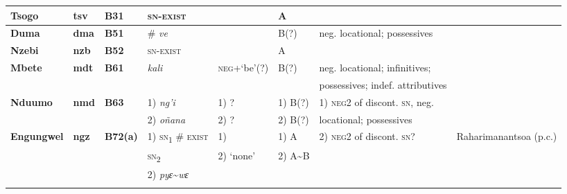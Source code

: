 \documentclass[output=paper]{langsci/langscibook}
\begin{document}
\begin{sidewaystable}[p]
\begin{scriptsize}
\begin{tabularx}{\textwidth}{llllllll}
\textbf{Tsogo}	&\textbf{tsv}		&\textbf{B31} 	&\textsc{sn-exist}	&\textendash								&A 		& 									&\citet{Marchal1979}\\\midrule
\textbf{Duma}	&\textbf{dma}	&\textbf{B51}	&\# \textit{ve}	&\textendash								&B(?)	&neg. locational; possessives 			&\citet{Adam1954}\\\midrule
\textbf{Nzebi}	&\textbf{nzb}	&\textbf{B52}	&\textsc{sn-exist}	&\textendash								&A 		& 				 					&\citet{Marchal1987}\\\midrule
\textbf{Mbete} 	&\textbf{mdt} 	&\textbf{B61} 	&\textit{kali} 	&\textsc{neg}+`be'(?) 					&B(?) 	&neg. locational; infinitives;			&\citet{Adam1954}\\
				&				&				&				&										&		&possessives; indef. attributives		&\\\midrule
\textbf{Nduumo} &\textbf{nmd} 	& \textbf{B63} 	&1) \textit{ng'i}	& 1) ?									&1) B(?)	&1) \textsc{neg}2 of discont. \textsc{sn}, neg.	&\citet{Adam1954}\\
				&				&				&2) \textit{o\~n{}ana} &2) ?									&2) B(?)	&locational; possessives 				&\\\midrule
\textbf{Engungwel} & \textbf{ngz} &\textbf{B72(a)} 	&1) \textsc{sn}\textsubscript{1} \# \textsc{exist}& 1) \textendash	&1) A&2) \textsc{neg}2 of discont. \textsc{sn}?&Raharimanantsoa (p.c.)\\
				&				&				&\textsc{sn}\textsubscript{2}&2) `none'							&2) A{\textasciitilde}B&						&\\
				&				&				&2) \textit{pyɛ}{\textasciitilde}\textit{wɛ}&					&		&									&\\
\lspbottomrule
\end{tabularx}\end{scriptsize}
\end{sidewaystable}
\end{document}
